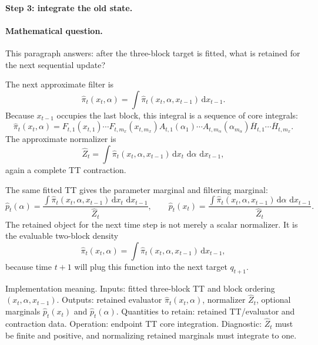 \documentclass[11pt]{article}
\numberwithin{equation}{section}
\newcommand{\dd}{\,\mathrm d}
\begin{document}
\paragraph{Step 3: integrate the old state.}
\paragraph{Mathematical question.}
This paragraph answers: after the three-block target is fitted, what is
retained for the next sequential update?

The next approximate filter is
\begin{equation}
    \widehat\pi_t(x_t,\alpha)
    =
    \int \widehat\pi_t(x_t,\alpha,x_{t-1})\dd x_{t-1}.
    \label{eq:p24-a1-3}
\end{equation}
Because \(x_{t-1}\) occupies the last block, this integral is a sequence of core
integrals:
\begin{equation}
    \widehat\pi_t(x_t,\alpha)
    =
    F_{t,1}(x_{t,1})\cdots F_{t,m_x}(x_{t,m_x})
    A_{t,1}(\alpha_1)\cdots A_{t,m_\alpha}(\alpha_{m_\alpha})
    \overline H_{t,1}\cdots \overline H_{t,m_x}.
    \label{eq:p24-a1-4}
\end{equation}
The approximate normalizer is
\begin{equation}
    \widehat Z_t
    =
    \int \widehat\pi_t(x_t,\alpha,x_{t-1})
    \dd x_t\,\dd\alpha\,\dd x_{t-1},
    \label{eq:p24-a1-5}
\end{equation}
again a complete TT contraction.

The same fitted TT gives the parameter marginal and filtering marginal:
\begin{equation}
    \widehat p_t(\alpha)
    =
    \frac{\int\widehat\pi_t(x_t,\alpha,x_{t-1})
    \dd x_t\,\dd x_{t-1}}
    {\widehat Z_t},
    \qquad
    \widehat p_t(x_t)
    =
    \frac{\int\widehat\pi_t(x_t,\alpha,x_{t-1})
    \dd\alpha\,\dd x_{t-1}}
    {\widehat Z_t}.
    \label{eq:p24-a1-6}
\end{equation}
The retained object for the next time step is not merely a scalar
normalizer.  It is the evaluable two-block density
\begin{equation}
    \widehat\pi_t(x_t,\alpha)
    =
    \int\widehat\pi_t(x_t,\alpha,x_{t-1})\dd x_{t-1},
    \label{eq:p24-a1-7}
\end{equation}
because time \(t+1\) will plug this function into the next target
\(q_{t+1}\).

Implementation meaning. Inputs: fitted three-block TT and block ordering
\((x_t,\alpha,x_{t-1})\).  Outputs: retained evaluator
\(\widehat\pi_t(x_t,\alpha)\), normalizer \(\widehat Z_t\), optional marginals
\(\widehat p_t(x_t)\) and \(\widehat p_t(\alpha)\).  Quantities to retain: retained
TT/evaluator and contraction data.  Operation: endpoint TT core
integration.  Diagnostic: \(\widehat Z_t\) must be finite and positive, and
normalizing retained marginals must integrate to one.
\end{document}
